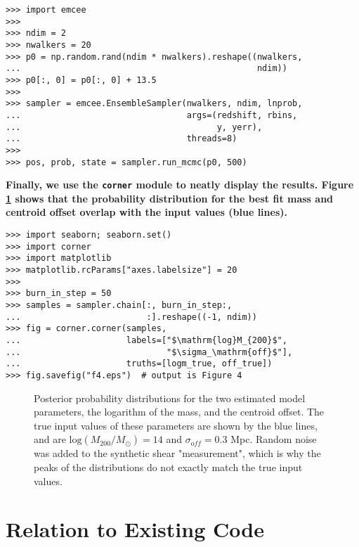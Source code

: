 \documentclass[twocolumn]{aastex6}
\newcommand{\code}{\lstinline[style=codeintext]}
\begin{document}
\begin{verbatim}
>>> import emcee
>>> 
>>> ndim = 2
>>> nwalkers = 20
>>> p0 = np.random.rand(ndim * nwalkers).reshape((nwalkers, 
...                                               ndim))
>>> p0[:, 0] = p0[:, 0] + 13.5
>>> 
>>> sampler = emcee.EnsembleSampler(nwalkers, ndim, lnprob,
...                                 args=(redshift, rbins, 
...                                       y, yerr), 
...                                 threads=8)
>>> 
>>> pos, prob, state = sampler.run_mcmc(p0, 500)
\end{verbatim}

{\bf Finally, we use the \code{corner} module \citep{corner} to neatly display the results. Figure \ref{f4} shows that the probability distribution for the best fit mass and centroid offset overlap with the input values (blue lines).}

\begin{verbatim}
>>> import seaborn; seaborn.set()
>>> import corner
>>> import matplotlib
>>> matplotlib.rcParams["axes.labelsize"] = 20
>>> 
>>> burn_in_step = 50
>>> samples = sampler.chain[:, burn_in_step:, 
...                         :].reshape((-1, ndim))
>>> fig = corner.corner(samples,
...                     labels=["$\mathrm{log}M_{200}$", 
...                             "$\sigma_\mathrm{off}$"],
...                     truths=[logm_true, off_true])
>>> fig.savefig("f4.eps")  # output is Figure 4
\end{verbatim}
\begin{figure}
\caption{Posterior probability distributions for the two estimated model parameters, the logarithm of the mass, and the centroid offset. The true input values of these parameters are shown by the blue lines, and are $\mathrm{log}(M_{200}/M_{\odot}) = 14$ and $\sigma_{\mathrm off} = 0.3$ Mpc. Random noise was added to the synthetic shear "measurement", which is why the peaks of the distributions do not exactly match the true input values.}
\label{f4}
\end{figure}


\section{Relation to Existing Code}
\end{document}
